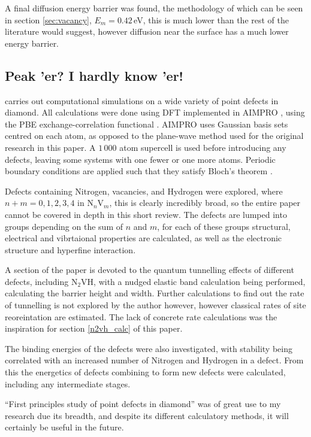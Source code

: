 \documentclass[10pt,a4paper,twocolumn,twoside]{extarticle}
\newcommand{\ntvh}{N$_2$VH}
\begin{document}
A final diffusion energy barrier was found, the methodology of which can be seen in section \ref{sec:vacancy}, $E_m = 0.42$\,eV, this is much lower than the rest of the literature would suggest, however diffusion near the surface has a much lower energy barrier.

\subsection{Peak 'er? I hardly know 'er!}
\textcite{Peaker} carries out computational simulations on a wide variety of point defects in diamond. All calculations were done using DFT implemented in AIMPRO \cite{AIMPRO}, using the PBE exchange-correlation functional \cite{PBE}. AIMPRO uses Gaussian basis sets centred on each atom, as opposed to the plane-wave method used for the original research in this paper. A $1\,000$ atom supercell is used before introducing any defects, leaving some systems with one fewer or one more atoms. Periodic boundary conditions are applied such that they satisfy Bloch's theorem \cite{Bloch}. 

Defects containing Nitrogen, vacancies, and Hydrogen were explored, where $n +m = 0, 1, 2, 3, 4$ in N$_n$V$_m$, this is clearly incredibly broad, so the entire paper cannot be covered in depth in this short review. The defects are lumped into groups depending on the sum of $n$ and $m$, for each of these groups structural, electrical and vibrtaional properties are calculated, as well as the electronic structure and hyperfine interaction.

A section of the paper is devoted to the quantum tunnelling effects of different defects, including {\ntvh}, with a nudged elastic band calculation being performed, calculating the barrier height and width. Further calculations to find out the rate of tunnelling is not explored by the author however, however classical rates of site reoreintation are estimated. The lack of concrete rate calculations was the inspiration for section \ref{n2vh_calc} of this paper.

The binding energies of the defects were also investigated, with stability being correlated with an increased number of Nitrogen and Hydrogen in a defect. From this the energetics of defects combining to form new defects were calculated, including any intermediate stages. 

``First principles study of point defects in diamond'' was of great use to my research due its breadth, and despite its different calculatory methods, it will certainly be useful in the future. 
\end{document}
